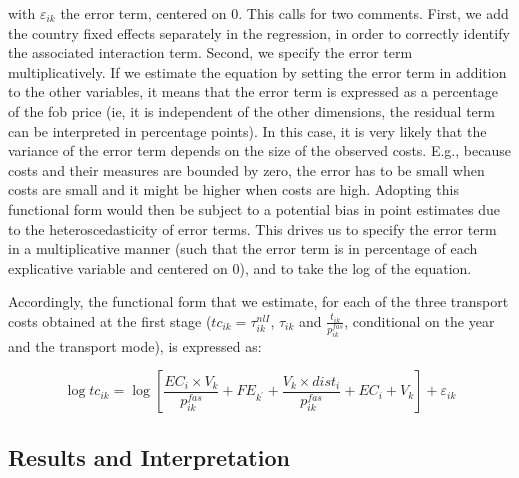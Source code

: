 \documentclass[a4paper,11pt]{article}
\begin{document}
with $\varepsilon_{ik}$ the error term, centered on 0. This calls for two comments. First, we add the country fixed effects separately in the regression, in order to correctly identify the associated interaction term. Second, we specify the error term multiplicatively. If we estimate the equation by setting the error term in addition to the other variables, it means that the error term is expressed as a percentage of the fob price (ie, it is independent of the other dimensions, the residual term can be interpreted in percentage points). In this case, it is very likely that the variance of the error term depends on the size of the observed costs. E.g., because costs and their measures are bounded by zero, the error has to be small when costs are small and it might be higher when costs are high. Adopting this functional form would then be subject to a potential bias in point estimates due to the heteroscedasticity of error terms. This drives us to specify the error term in a multiplicative manner (such that the error term is in percentage of each explicative variable and centered on 0), and to take the log of the equation.

Accordingly, the functional form that we estimate, for each of the three transport costs obtained at the first stage ($tc_{ik} = \tau^{nlI}_{ik}$, $\tau_{ik}$ and $\frac{t_{ik}}{p^{fas}_{ik}}$, conditional on the year and the transport mode), is expressed as:

\begin{equation}
\log tc_{ik} = \log\left[\frac{EC_i\times V_{k}}{p^{fas}_{ik}} + FE_{k^\prime}+ \frac{V_k\times dist_i}{p_{ik}^{fas}} + EC_i + V_k \right]+ \varepsilon_{ik} \label{eq:estim1}
\end{equation}





\subsection{Results and Interpretation}
\end{document}
